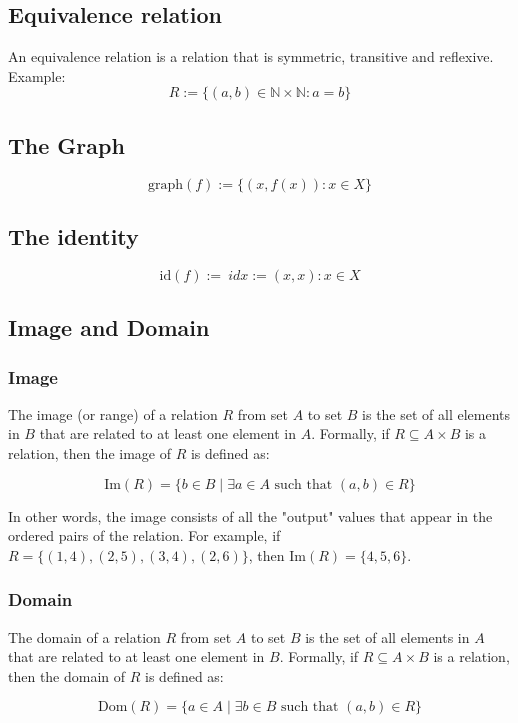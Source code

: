 \subsection{Equivalence relation}
An equivalence relation is a relation that is symmetric, transitive and reflexive.
\\
Example:
\[
R:= \{ (a,b) \in \mathbb{N} \times \mathbb{N}: a = b\}
\]

\subsection{The Graph}

\[
    \text{graph}(f):= \{(x, f(x)): x \in X\}
\]

\subsection{The identity}

\[
    \text{id}(f):= \ idx:={(x, x): x \in X}
\]

\subsection{Image and Domain}

\subsubsection{Image}
The image (or range) of a relation $R$ from set $A$ to set $B$ is the set of all elements in $B$ that are related to at least one element in $A$. Formally, if $R \subseteq A \times B$ is a relation, then the image of $R$ is defined as:

$$\text{Im}(R) = \{b \in B \mid \exists a \in A \text{ such that } (a,b) \in R\}$$

In other words, the image consists of all the "output" values that appear in the ordered pairs of the relation. For example, if $R = \{(1,4), (2,5), (3,4), (2,6)\}$, then $\text{Im}(R) = \{4, 5, 6\}$.

\subsubsection{Domain}
The domain of a relation $R$ from set $A$ to set $B$ is the set of all elements in $A$ that are related to at least one element in $B$. Formally, if $R \subseteq A \times B$ is a relation, then the domain of $R$ is defined as:

$$\text{Dom}(R) = \{a \in A \mid \exists b \in B \text{ such that } (a,b) \in R\}$$

